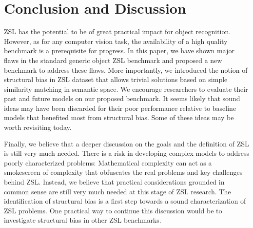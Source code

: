 \section{Conclusion and Discussion}
ZSL has the potential to be of great practical impact for object recognition.
However, as for any computer vision task, the availability of a high quality benchmark is a prerequisite for progress.
In this paper, we have shown major flaws in the standard generic object ZSL benchmark and proposed a new benchmark to address these flaws.
More importantly, we introduced the notion of structural bias in ZSL dataset that allows trivial solutions based on simple similarity matching in semantic space.
We encourage researchers to evaluate their past and future models on our proposed benchmark.
It seems likely that sound ideas may have been discarded for their poor performance 
relative to baseline models that benefited most from structural bias.
Some of these ideas may be worth revisiting today.

Finally, we believe that a deeper discussion on the goals and the definition of ZSL is still very much needed.
There is a risk in developing complex models to address poorly characterized problems:
Mathematical complexity can act as a smokescreen of complexity that obfuscates the real problems and key challenges behind ZSL.
Instead, we believe that practical considerations grounded in common sense are still very much needed at this stage of ZSL research.
The identification of structural bias is a first step towards a sound characterization of ZSL problems.
One practical way to continue this discussion would be to investigate structural bias in other ZSL benchmarks.
